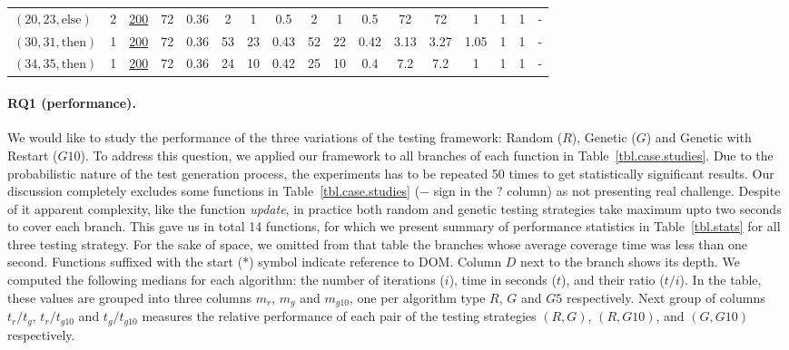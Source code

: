 \documentclass[sigconf]{acmart}
\newcommand{\thenBr}{\text{then}}
\newcommand{\elseBr}{\text{else}}
\newcommand{\un}[1]{\underline{#1}}
\begin{document}
\begin{table}[!t]
\begin{tabular}{lc|ccc|ccc|ccc|ccc|ccc}
    $(20,23,\elseBr)$ & 2        & \un{200} & 72   & 0.36      & 2   & 1    & 0.5           & 2   & 1   & 0.5              & 72     & 72    & 1      & 1 & 1 &  -  \\
    $(30,31,\thenBr)$ & 1        & \un{200} & 72   & 0.36      & 53  & 23   & 0.43          & 52  & 22  & 0.42             & 3.13   & 3.27  & 1.05   & 1 & 1 &  -  \\
    $(34,35,\thenBr)$ & 1        & \un{200} & 72   & 0.36      & 24  & 10   & 0.42          & 25  & 10  & 0.4              & 7.2    & 7.2   & 1      & 1 & 1 &  -  \\
    \bottomrule
    \end{tabular}
\end{table}

\paragraph{\textbf{RQ1 (performance).}} We would like to study the performance of the three variations of the testing framework: Random ($R$), Genetic ($G$) and Genetic with Restart ($G10$). To address this question, we applied our framework to all branches of each function in Table~\ref{tbl.case.studies}. Due to the probabilistic nature of the test generation process, the experiments has to be repeated 50 times to get statistically significant results. Our discussion completely excludes some functions in Table~\ref{tbl.case.studies} ($-$ sign in the $?$ column) as not presenting real challenge. Despite of it apparent complexity, like the function \emph{update}, in practice both random and genetic testing strategies take maximum upto two seconds to cover each branch. This gave us in total 14 functions, for which we present summary of performance statistics in Table~\ref{tbl.stats} for all three testing strategy. For the sake of space, we omitted from that table the branches whose average coverage time was less than one second. Functions suffixed with the start (*) symbol indicate reference to DOM.  Column $D$ next to the branch shows its depth. We computed the following medians for each algorithm: the number of iterations ($i$), time in seconds ($t$), and their ratio ($t/i$). In the table, these values are grouped into three columns $m_r$, $m_g$ and $m_{g10}$, one per algorithm type $R$, $G$ and $G5$  respectively. Next group of columns $t_r/t_g$, $t_r/t_{g10}$ and $t_g/t_{g10}$ measures the relative performance of each pair of the testing strategies $(R,G)$, $(R,G10)$, and $(G,G10)$ respectively.
\end{document}
